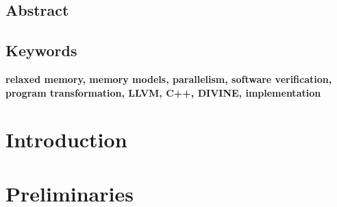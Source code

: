 \documentclass[11pt,twoside,a4paper]{book}
\newcommand{\FI}{Faculty of Informatics}
\newcommand{\MU}{Masaryk University}
\newcommand{\Jirik}{prof. RNDr. Jiří Barnat, Ph.D.}
\newcommand{\thesistitle}{Analysis of Parallel C++ Programs} %
\newcommand{\thesissubtitle}{PHD Thesis}
\newcommand{\thesisauthor}{Vladimír Štill}
\newcommand{\thesisYearCity}{Brno, 2020}
\newcommand{\thesisadvisor}{\Jirik}
\theoremstyle{mydefstyle}
\newcommand{\TODO}[1]{{\bf\color{red}#1}}
\begin{document}

\frontmatter
 
 
\cleardoublepage

\section*{Abstract}
% 

\section*{Keywords}
\TODO{relaxed memory, memory models, parallelism, software verification, program transformation,
LLVM, C++, DIVINE, implementation}

\cleardoublepage
\thispagestyle{empty}

\pagestyle{headings}
\tableofcontents %
\mainmatter

\chapter{Introduction}\label{chap:introduction}


\chapter{Preliminaries}

\end{document}
